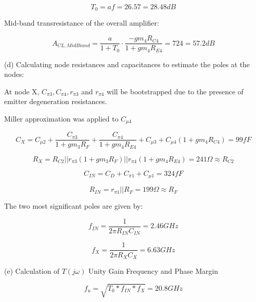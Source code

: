 \documentclass[12pt,a4paper]{article}
\begin{document}
\begin{equation}
  T_{0} = a f = 26.57 = 28.48dB
\end{equation}

Mid-band transresistance of the overall amplifier:

\begin{equation}
  A_{CL, MidBiand} = \frac{a}{1 + T_0} \cdot \frac{-gm_4 R_{C4}}{1 + gm_4 R_{E4}} = 724 = 57.2dB
\end{equation}

\newpage
(d) Calculating node resistances and capacitances to estimate the poles at the nodes:

At node X, $C_{\pi 3}, C_{\pi 4}, r_{\pi 3}$ and $r_{\pi 4}$ will be bootstrapped due to the presence of emitter degeneration resistances.

Miller approximation was applied to $C_{\mu 4}$

\begin{equation}
  C_X = C_{\mu 2} + \frac{C_{\pi 3}}{1 + gm_3 R_F} + \frac{C_{\pi 4}}{1+gm_4 R_{E4}} + C_{\mu 3} + C_{\mu 4} (1 + gm_4 R_{C4}) = 99fF
\end{equation}

\begin{equation}
  R_X = R_{C2} || r_{\pi 3}(1+gm_3 R_F) || r_{\pi4}(1+gm_4 R_{E4}) = 241\Omega \approx R_{C2}
\end{equation}

\begin{equation}
  C_{IN} = C_D + C_{\pi1} + C_{\mu1} = 324fF
\end{equation}

\begin{equation}
  R_{IN} = r_{\pi1} || R_F = 199\Omega \approx R_F
\end{equation}

The two most significant poles are given by:

\begin{equation}
  f_{IN} = \frac{1}{2 \pi R_{IN} C_{IN}} = 2.46GHz
\end{equation}

\begin{equation}
  f_{X} = \frac{1}{2 \pi R_{X} C_{X}} = 6.63GHz
\end{equation}

\newpage
(e) Calculation of $T(j\omega)$ Unity Gain Frequency and Phase Margin

\begin{equation}
  f_{u} = \sqrt{T_0 * f_{IN} * f_{X}} = 20.8GHz
\end{equation}
\end{document}
